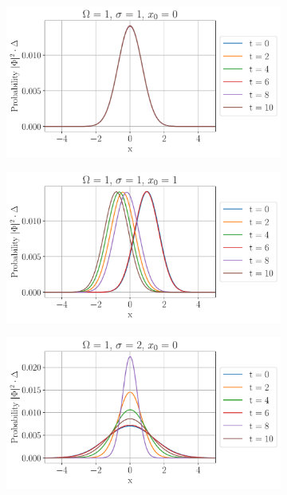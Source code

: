 \begin{figure}[h!]
\centering
     \begin{subfigure}[h]{0.7\textwidth}
         \centering
         \includegraphics[width=\textwidth]{plot/Omega1_sigma1_x00_Probabilities.pdf}
         \caption{}
     \end{subfigure}

     \begin{subfigure}[h]{0.7\textwidth}
         \centering
         \includegraphics[width=\textwidth]{plot/Omega1_sigma1_x01_Probabilities.pdf}
         \caption{}
         
     \end{subfigure}
     
     \begin{subfigure}[h]{0.7\textwidth}
         \centering
         \includegraphics[width=\textwidth]{plot/Omega1_sigma2_x00_Probabilities.pdf}
         \caption{}
        
     \end{subfigure}
\end{figure}

